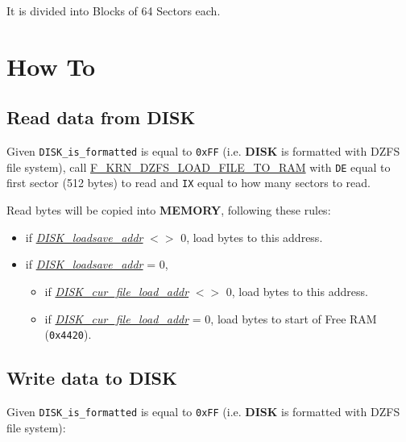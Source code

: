 \documentclass[a4paper,11pt]{article}
\begin{document}
        It is divided into Blocks of 64 Sectors each.

    \pagebreak
    \section{How To}

    \subsection{Read data from DISK}
    \label{sec:howto_readdata}
    Given \texttt{DISK\_is\_formatted} is equal to \texttt{0xFF} (i.e.
    \textbf{DISK} is formatted with DZFS file system), call
    \hyperref[func:fkrndzfsloadfiletoram]{F\_KRN\_DZFS\_LOAD\_FILE\_TO\_RAM}
    with \texttt{DE} equal to first sector (512 bytes) to read and \texttt{IX}
    equal to how many sectors to read.

    Read bytes will be copied into \textbf{MEMORY}, following these rules:

    \begin{itemize}
        \item if \textit{\hyperref[sec:ram_memmap]{DISK\_loadsave\_addr}} $<>$
        0, load bytes to this address.
        \item if \textit{\hyperref[sec:ram_memmap]{DISK\_loadsave\_addr}} = 0,
        \begin{itemize}
            \item if \textit{\hyperref[sec:ram_memmap]{DISK\_cur\_file\_load\_addr}}
            $<>$ 0, load bytes to this address.
            \item if \textit{\hyperref[sec:ram_memmap]{DISK\_cur\_file\_load\_addr}}
            = 0, load bytes to start of Free RAM (\texttt{0x4420}).
        \end{itemize}
    \end{itemize}

    \subsection{Write data to DISK}
    \label{sec:howto_writedata}
    Given \texttt{DISK\_is\_formatted} is equal to \texttt{0xFF} (i.e.
    \textbf{DISK} is formatted with DZFS file system):
\end{document}
